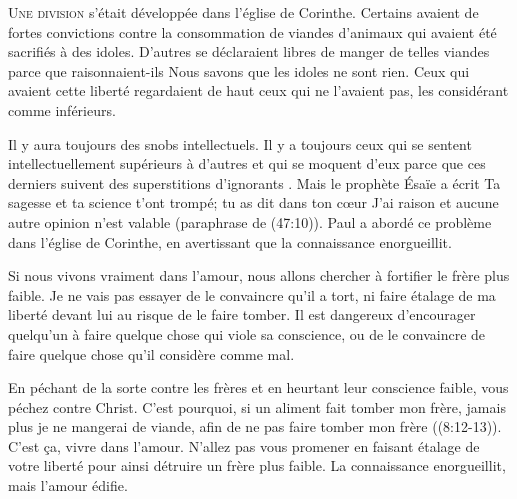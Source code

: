 


\lettrine{U}{ne division} s'était développée dans l'église de Corinthe.
 Certains avaient de fortes convictions
 contre la consommation de viandes d'animaux
 qui avaient été sacrifiés à des idoles.
 D'autres se déclaraient libres de manger
 de telles viandes parce que \ocadr raisonnaient-ils \fcadr{}
 \Og Nous savons que les idoles ne sont rien. \Fg{}
 Ceux qui avaient cette liberté regardaient de haut
 ceux qui ne l'avaient pas, les considérant comme inférieurs.

Il y aura toujours des snobs intellectuels.
 Il y a toujours ceux qui se sentent intellectuellement
 supérieurs à d'autres et qui se moquent d'eux
 parce que ces derniers suivent \Og des superstitions d'ignorants \Fg{}.
 Mais le prophète Ésaïe a écrit\frcolon{} 
 \Og Ta sagesse et ta science t'ont trompé;
 tu as dit dans ton c\oe{}ur\frcolon{} 
 \Og J'ai raison et aucune autre opinion n'est valable \Fg{}
 (paraphrase de (47:10)).
 Paul a abordé ce problème dans l'église de Corinthe,
 en avertissant que \Og la connaissance enorgueillit. \Fg{}


Si nous vivons vraiment dans l'amour,
 nous allons chercher à fortifier le frère plus faible.
 Je ne vais pas essayer de le convaincre qu'il a tort,
 ni faire étalage de ma liberté devant lui
 au risque de le faire tomber.
 Il est dangereux d'encourager quelqu'un
 à faire quelque chose qui viole sa conscience,
 ou de le convaincre de faire quelque chose
 qu'il considère comme mal.

\Og En péchant de la sorte contre les frères
 et en heurtant leur conscience faible,
 vous péchez contre Christ.
 C'est pourquoi, si un aliment fait tomber mon frère,
 jamais plus je ne mangerai de viande,
 afin de ne pas faire tomber mon frère \Fg{}
 ((8:12-13)).
 C'est \c{c}a, vivre dans l'amour.
 N'allez pas vous promener en faisant étalage
 de votre liberté pour ainsi détruire un frère plus faible.
 La connaissance enorgueillit, mais l'amour édifie.

\dvrule



